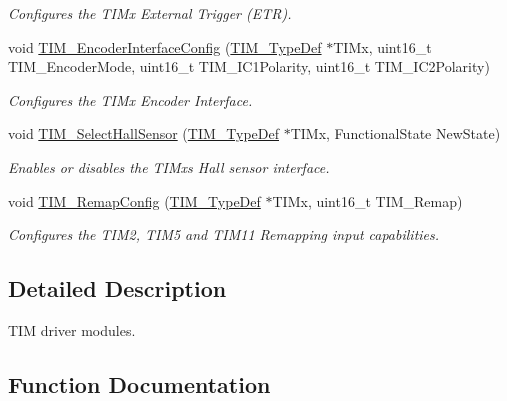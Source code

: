 \begin{DoxyCompactItemize}
\begin{DoxyCompactList}\small\item\em Configures the T\+I\+Mx External Trigger (E\+TR). \end{DoxyCompactList}\item 
void \hyperlink{group___t_i_m_ga0fc7e76c47a3bd1ba1ebc71427832b51}{T\+I\+M\+\_\+\+Encoder\+Interface\+Config} (\hyperlink{struct_t_i_m___type_def}{T\+I\+M\+\_\+\+Type\+Def} $\ast$T\+I\+Mx, uint16\+\_\+t T\+I\+M\+\_\+\+Encoder\+Mode, uint16\+\_\+t T\+I\+M\+\_\+\+I\+C1\+Polarity, uint16\+\_\+t T\+I\+M\+\_\+\+I\+C2\+Polarity)
\begin{DoxyCompactList}\small\item\em Configures the T\+I\+Mx Encoder Interface. \end{DoxyCompactList}\item 
void \hyperlink{group___t_i_m_ga42c2d1025a3937c9d9f38631af86ffa4}{T\+I\+M\+\_\+\+Select\+Hall\+Sensor} (\hyperlink{struct_t_i_m___type_def}{T\+I\+M\+\_\+\+Type\+Def} $\ast$T\+I\+Mx, Functional\+State New\+State)
\begin{DoxyCompactList}\small\item\em Enables or disables the T\+I\+Mx\textquotesingle{}s Hall sensor interface. \end{DoxyCompactList}\item 
void \hyperlink{group___t_i_m_ga08ffb6f2bfa96b6fbcbb8d8001cb8ba9}{T\+I\+M\+\_\+\+Remap\+Config} (\hyperlink{struct_t_i_m___type_def}{T\+I\+M\+\_\+\+Type\+Def} $\ast$T\+I\+Mx, uint16\+\_\+t T\+I\+M\+\_\+\+Remap)
\begin{DoxyCompactList}\small\item\em Configures the T\+I\+M2, T\+I\+M5 and T\+I\+M11 Remapping input capabilities. \end{DoxyCompactList}\end{DoxyCompactItemize}


\subsection{Detailed Description}
T\+IM driver modules. 



\subsection{Function Documentation}
\mbox{\label{group___t_i_m_ga42b44b9fc2b0798d733720dd6bac1ac0}} 
